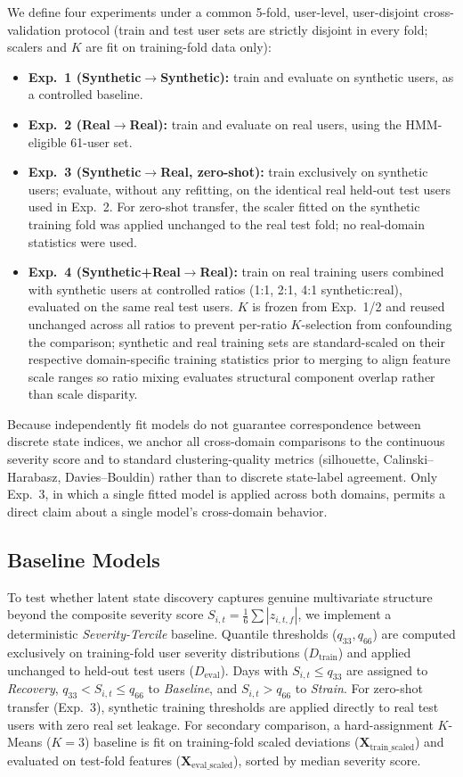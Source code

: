 \documentclass[conference]{IEEEtran}
\begin{document}
We define four experiments under a common 5-fold, user-level, user-disjoint cross-validation protocol (train and test user sets are strictly disjoint in every fold; scalers and $K$ are fit on training-fold data only):
\begin{itemize}
\item \textbf{Exp.~1 (Synthetic$\rightarrow$Synthetic):} train and evaluate on synthetic users, as a controlled baseline.
\item \textbf{Exp.~2 (Real$\rightarrow$Real):} train and evaluate on real users, using the HMM-eligible 61-user set.
\item \textbf{Exp.~3 (Synthetic$\rightarrow$Real, zero-shot):} train exclusively on synthetic users; evaluate, without any refitting, on the identical real held-out test users used in Exp.~2. For zero-shot transfer, the scaler fitted on the synthetic training fold was applied unchanged to the real test fold; no real-domain statistics were used.
\item \textbf{Exp.~4 (Synthetic+Real$\rightarrow$Real):} train on real training users combined with synthetic users at controlled ratios (1:1, 2:1, 4:1 synthetic:real), evaluated on the same real test users. $K$ is frozen from Exp.~1/2 and reused unchanged across all ratios to prevent per-ratio $K$-selection from confounding the comparison; synthetic and real training sets are standard-scaled on their respective domain-specific training statistics prior to merging to align feature scale ranges so ratio mixing evaluates structural component overlap rather than scale disparity.
\end{itemize}
Because independently fit models do not guarantee correspondence between discrete state indices, we anchor all cross-domain comparisons to the continuous severity score and to standard clustering-quality metrics (silhouette, Calinski--Harabasz, Davies--Bouldin) rather than to discrete state-label agreement. Only Exp.~3, in which a single fitted model is applied across both domains, permits a direct claim about a single model's cross-domain behavior.

\subsection{Baseline Models}

To test whether latent state discovery captures genuine multivariate structure beyond the composite severity score $S_{i,t} = \frac{1}{6}\sum |z_{i,t,f}|$, we implement a deterministic \emph{Severity-Tercile} baseline. Quantile thresholds ($q_{33}, q_{66}$) are computed exclusively on training-fold user severity distributions ($D_{\text{train}}$) and applied unchanged to held-out test users ($D_{\text{eval}}$). Days with $S_{i,t} \le q_{33}$ are assigned to \textit{Recovery}, $q_{33} < S_{i,t} \le q_{66}$ to \textit{Baseline}, and $S_{i,t} > q_{66}$ to \textit{Strain}. For zero-shot transfer (Exp.~3), synthetic training thresholds are applied directly to real test users with zero real set leakage. For secondary comparison, a hard-assignment $K$-Means ($K=3$) baseline is fit on training-fold scaled deviations ($\mathbf{X}_{\text{train\_scaled}}$) and evaluated on test-fold features ($\mathbf{X}_{\text{eval\_scaled}}$), sorted by median severity score.
\end{document}
